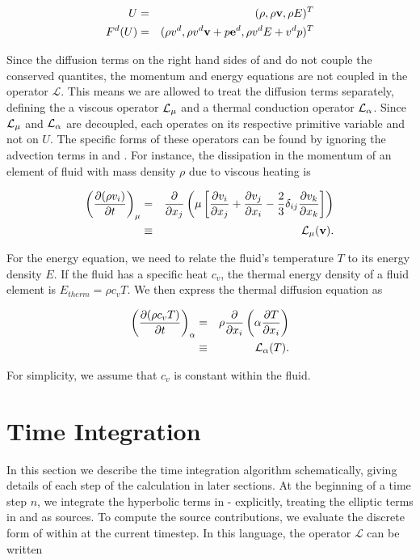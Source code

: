 \begin{eqnarray}
U &=& (\rho, \rho\mathbf{v}, \rho E)^T \label{eq:solnVector} \\
F^d(U) &=& (\rho v^d, \rho v^d\mathbf{v} + p\mathbf{e}^d,\rho v^d E + v^d p)^T \label{eq:Fd}
\end{eqnarray}

\noindent
Since the diffusion terms on the right hand sides of  and 
 do not couple the conserved quantites, the momentum and energy 
equations are not coupled in the operator $\mathcal{L}$. This means we are 
allowed to treat the diffusion terms separately, defining the a viscous 
operator $\mathcal{L}_\mu$ and a thermal conduction operator $\mathcal{L}_\alpha$. Since $\mathcal{L}_\mu$ and 
$\mathcal{L}_\alpha$ are decoupled, each operates on its respective primitive variable and 
not on $U$. The specific forms of these operators can be found by ignoring 
the advection terms in  and .  For instance, the 
dissipation in the momentum of an element of fluid with mass density $\rho$ 
due to viscous heating is

\begin{eqnarray}
\left(\frac{\partial (\rho v_i)}{\partial t}\right)_{\mu} &=& \frac{\partial }{\partial x_j}\left(\mu\left[\frac{\partial v_i}{\partial x_j} + \frac{\partial v_j}{\partial x_i} - \frac{2}{3}\delta_{ij}\frac{\partial v_k}{\partial x_k}\right]\right) \notag \\
                                    &\equiv& \mathcal{L}_\mu(\mathbf{v}). \label{eq:Lmu}
\end{eqnarray}

\noindent
For the energy equation, we need to relate the fluid's temperature $T$ to its 
energy density $E$. If the fluid has a specific heat $c_v$, the thermal energy 
density of a fluid element is $E_{therm} = \rho c_v T$.  We then express the 
thermal diffusion equation as

\begin{eqnarray}
\left(\frac{\partial (\rho c_v T)}{\partial t}\right)_\alpha &=& \rho\frac{\partial }{\partial x_i}\left(\alpha\frac{\partial T}{\partial x_i}\right) \notag \\
                                       &\equiv& \mathcal{L}_\alpha(T). \label{eq:Lalpha}
\end{eqnarray}

\noindent
For simplicity, we assume that $c_v$ is constant within the fluid.  

\section{Time Integration\label{sec:TimeIntegration}}

In this section we describe the time integration algorithm schematically, 
giving details of each step of the calculation in later sections.
At the beginning of a time step $n$, we integrate the hyperbolic terms in 
 -  explicitly, treating the elliptic terms in 
 and  as sources. To compute the source 
contributions, we evaluate the discrete form of  within  at
the current timestep.  In this language, the operator $\mathcal{L}$ can 
be written

